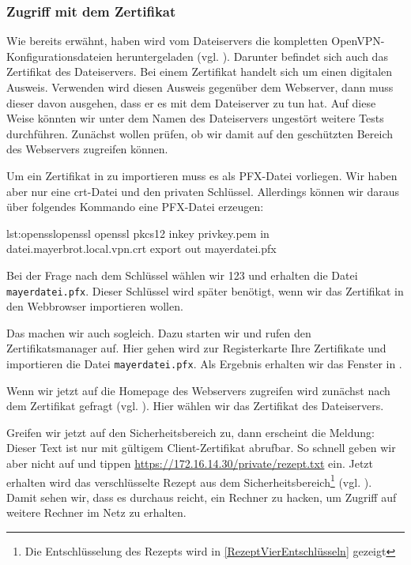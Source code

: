 \subsubsection{Zugriff mit dem Zertifikat}

Wie bereits erwähnt, haben wird vom Dateiservers die kompletten OpenVPN-Konfigurationsdateien heruntergeladen (vgl. ). Darunter befindet sich auch das Zertifikat des Dateiservers. Bei einem Zertifikat handelt sich um einen digitalen Ausweis. Verwenden wird diesen Ausweis gegenüber dem Webserver, dann muss dieser davon ausgehen, dass er es mit dem Dateiserver zu tun hat. Auf diese Weise könnten wir unter dem Namen des Dateiservers ungestört weitere Tests durchführen. Zunächst wollen prüfen, ob wir damit auf den geschützten Bereich des Webservers zugreifen können. 


Um ein Zertifikat in \Firefox{} zu importieren muss es als PFX-Datei vorliegen. Wir haben aber nur eine crt-Datei und den privaten Schlüssel. Allerdings können wir daraus über folgendes Kommando eine PFX-Datei erzeugen:

\begin{MetasploitCode}{lst:openssl}{openssl}
openssl pkcs12 inkey privkey.pem in datei.mayerbrot.local.vpn.crt export out mayerdatei.pfx
\end{MetasploitCode}

Bei der Frage nach dem Schlüssel wählen wir 123 und erhalten die Datei \texttt{mayerdatei.pfx}. Dieser Schlüssel wird später benötigt, wenn wir das Zertifikat in den Webbrowser importieren wollen.

Das machen wir auch sogleich. Dazu starten wir \Firefox{} und rufen den Zertifikatsmanager auf. Hier gehen wird zur Registerkarte \glqq{}Ihre Zertifikate\grqq{} und importieren die Datei \texttt{mayerdatei.pfx}. Als Ergebnis erhalten wir das Fenster in .


Wenn wir jetzt auf die Homepage des Webservers zugreifen wird zunächst nach dem Zertifikat gefragt (vgl. ). Hier wählen wir das Zertifikat des Dateiservers.


Greifen wir jetzt auf den Sicherheitsbereich zu, dann erscheint die Meldung: \glqq{}Dieser Text ist nur mit gültigem Client-Zertifikat abrufbar\grqq{}. So schnell geben wir aber nicht auf und tippen \url{https://172.16.14.30/private/rezept.txt} ein. Jetzt erhalten wird das verschlüsselte Rezept aus dem Sicherheitsbereich\footnote{Die Entschlüsselung des Rezepts wird in \cref{RezeptVierEntschlüsseln} gezeigt} (vgl. ). Damit sehen wir, dass es durchaus reicht, ein Rechner zu hacken, um Zugriff auf weitere Rechner im Netz zu erhalten.




